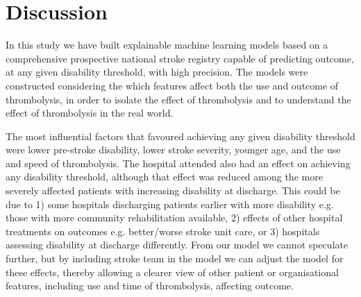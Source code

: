 \section{Discussion}



In this study we have built explainable machine learning models based on a comprehensive prospective national stroke registry capable of predicting outcome, at any given disability threshold, with high precision. The models were constructed considering the which features affect both the use and outcome of thrombolysis, in order to isolate the effect of thrombolysis and to understand the effect of thrombolysis in the real world.

The most influential factors that favoured achieving any given disability threshold were lower pre-stroke disability, lower stroke severity, younger age, and the use and speed of thrombolysis. The hospital attended also had an effect on achieving any disability threshold, although that effect was reduced among the more severely affected patients with increasing disability at discharge. This could be due to 1) some hospitals discharging patients earlier with more disability e.g. those with more community rehabilitation available, 2) effects of other hospital treatments on outcomes e.g. better/worse stroke unit care, or 3) hospitals assessing disability at discharge differently. From our model we cannot speculate further, but by including stroke team in the model we can adjust the model for these effects, thereby allowing a clearer view of other patient or organisational features, including use and time of thrombolysis, affecting outcome.

